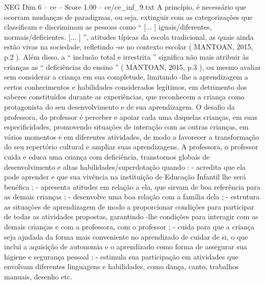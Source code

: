 \begin{textsample}{NEG Dim 6 – ce – Score 1.00 – ce/ce\_inf\_9.txt}
A princípio, é necessário que ocorram mudanças de paradigmas, ou seja, extinguir com as categorizações que classificam e discriminam as pessoas como “ [... ] iguais/diferentes, normais/deficientes. [... ] ”, atitudes típicas da escola tradicional, as quais ainda estão vivas na sociedade, refletindo -se no contexto escolar ( MANTOAN, 2015, p.2 ).
Além disso, a “ inclusão total e irrestrita ” significa não mais atribuir às crianças as “ deficiências do ensino ” ( MANTOAN, 2015, p.3 ), ou mesmo avaliar sem considerar a criança em sua completude, limitando -lhe a aprendizagem a certos conhecimentos e habilidades considerados legítimos, em detrimento dos saberes constituídos durante as experiências, que reconhecem a criança como protagonista do seu desenvolvimento e de sua aprendizagem.
O desafio da professora, do professor é perceber e apoiar cada uma daquelas crianças, em suas especificidades, promovendo situações de interação com as outras crianças, em vários momentos e em diferentes atividades, de modo a favorecer a transformação do seu repertório cultural e ampliar suas aprendizagens.
A professora, o professor cuida e educa uma criança com deficiência, transtornos globais de desenvolvimento e altas habilidades/superdotação quando : - acredita que ela pode aprender e que sua vivência na instituição de Educação Infantil lhe será benéfica ; - apresenta atitudes em relação a ela, que sirvam de boa referência para as demais crianças ; - desenvolve uma boa relação com a família dela ; - estrutura as situações de aprendizagem de modo a proporcionar condições para participar de todas as atividades propostas, garantindo -lhe condições para interagir com as demais crianças e com a professora, com o professor ; - cuida para que a criança seja ajudada da forma mais conveniente no aprendizado de cuidar de si, o que inclui a aquisição de autonomia e o aprendizado como forma de assegurar sua higiene e segurança pessoal ; - estimula sua participação em atividades que envolvam diferentes linguagens e habilidades, como dança, canto, trabalhos manuais, desenho etc.

\end{textsample}
